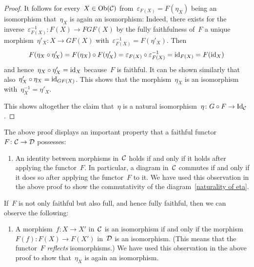 \begin{proof}
  It follows for every~$X \in \operatorname{Ob}(\mathcal{C})$ from~$\varepsilon_{F(X)} = F(\eta_X)$ being an isomorphism that~$\eta_X$ is again an isomorphism:
  Indeed, there exists for the inverse~$\varepsilon_{F(X)}^{-1} \colon F(X) \to FGF(X)$ by the fully faithfulness of~$F$ a unique morphism~$\eta'_X \colon X \to GF(X)$ with~$\varepsilon_{F(X)}^{-1} = F(\eta'_X)$.
  Then
  \[
      F(\eta_X \circ \eta'_X)
    = F(\eta_X) \circ F(\eta'_X)
    = \varepsilon_{F(X)} \circ \varepsilon_{F(X)}^{-1}
    = \mathrm{id}_{F(X)}
    = F(\mathrm{id}_X)
  \]
  and hence~$\eta_X \circ \eta'_X = \mathrm{id}_X$ because~$F$ is faithful.
  It can be shown similarly that also~$\eta'_X \circ \eta_X = \mathrm{id}_{GF(X)}$.
  This shows that the morphism~$\eta_X$ is an isomorphism with~$\eta_X^{-1} = \eta'_X$.
  
  This shows altogether the claim that~$\eta$ is a natural isomorphism~$\eta \colon G \circ F \to \mathrm{Id}_{\mathcal{C}}$.
\end{proof}


\begin{remark*}
  The above proof displays an important property that a faithful functor~$F \colon \mathcal{C} \to \mathcal{D}$ possesses:
  \begin{enumerate}
    \item
      An identity between morphisms in~$\mathcal{C}$ holds if and only if it holds after applying the functor~$F$.
      In particular, a diagram in~$\mathcal{C}$ commutes if and only if it does so after applying the functor~$F$ to it.
      We have used this observation in the above proof to show the commutativity of the diagram~\eqref{naturality of eta}.
  \end{enumerate}
  If~$F$ is not only faithful but also full, and hence fully faithful, then we can observe the following:
  \begin{enumerate}[resume]
    \item
      A morphism~$f \colon X \to X'$ in~$\mathcal{C}$ is an isomorphism if and only if the morphism~$F(f) \colon F(X) \to F(X')$ in~$\mathcal{D}$ is an isomorphism.
      (This means that the functor~$F$ \emph{reflects} isomorphisms.)
      We have used this observation in the above proof to show that~$\eta_X$ is again an isomorphism.
  \end{enumerate}
\end{remark*}


